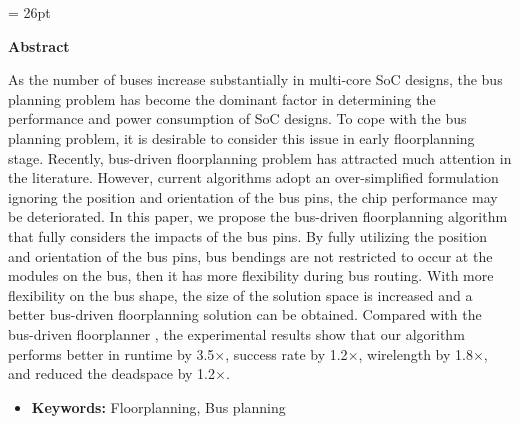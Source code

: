 

\baselineskip = 26pt


\newpage
{}



\begin{center}
\large \textbf{Abstract}
\end{center}


As the number of buses increase substantially in multi-core SoC
designs, the bus planning problem has become the dominant factor
in determining the performance and power consumption of SoC
designs. To cope with the bus planning problem, it is desirable to
consider this issue in early floorplanning stage. Recently,
bus-driven floorplanning problem has attracted much attention in
the literature. However, current algorithms adopt an
over-simplified formulation ignoring the position and
orientation of the bus pins, the chip performance may be deteriorated.
In this paper, we propose the bus-driven
floorplanning algorithm that fully considers the impacts of the bus
pins. By fully utilizing the position and orientation of the bus pins,
bus bendings are not restricted to occur at the modules on the bus,
then it has more flexibility during bus routing. With more
flexibility on the bus shape, the size of the solution
space is increased and a better bus-driven floorplanning solution
can be obtained. Compared with the bus-driven
floorplanner \cite{Ma08}, the experimental results show that our
algorithm performs better in runtime by 3.5$\times$, success rate
by 1.2$\times$, wirelength by 1.8$\times$, and reduced the
deadspace by 1.2$\times$.


\begin{itemize}
\item {\bf Keywords:} Floorplanning, Bus planning
\end{itemize}




